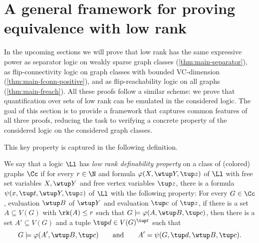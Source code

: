 \section{A general framework for proving equivalence with low rank \mso}\label{sec:framework}

In the upcoming sections we will prove that low rank \mso has the same expressive power as separator logic on weakly sparse graph classes (\cref{thm:main-separator}), as flip-connectivity logic on graph classes with bounded VC-dimension (\cref{thm:main-fconn-positive}), and as flip-reachability logic on all graphs (\cref{thm:main-freach}). All these proofs follow a similar scheme: we prove that quantification over sets of low rank can be emulated in the considered logic. The goal of this section is to provide a framework that captures common features of all three proofs, reducing the task to verifying a concrete property of the considered logic on the considered graph classes.

This key property is captured in the following definition.

\begin{definition}
    \label{def:low-rank-definability}
    We say that a logic $\Ll$ has \emph{low rank definability property} on a class of (colored) graphs $\Cc$ if for every $r \in \N$ and formula $\varphi(X, \wtup Y, \tup z)$ of $\Ll$ with free set variables $X, \wtup Y$ and free vertex variables $\tup z$, there is a formula $\psi(x, \tup t, \wtup Y, \tup z)$ of $\Ll$ with the following property: For every $G \in \Cc$, evaluation $\wtup B$ of $\wtup Y$ and evaluation $\tup c$ of $\tup z$, if there is a set $A \subseteq V(G)$ with $\rk(A) \le r$ such that $G \models \varphi(A, \wtup B, \tup c)$, then there is a set $A' \subseteq V(G)$ and a tuple $\tup d \in V(G)^{\tup t}$ such that
    \[G \models \varphi(A', \wtup B, \tup c)\qquad \textrm{and}\qquad A' = \psi(G, \tup d, \wtup B, \tup c).\]
\end{definition}

